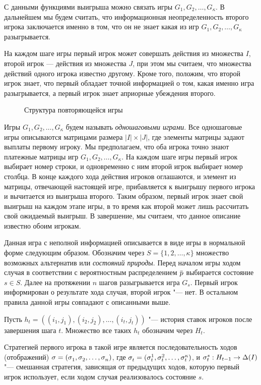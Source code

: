 {С данными функциями выигрыша можно связать игры $G_1, G_2, \ldots, G_\kappa$.
В дальнейшем мы будем считать, что информационная неопределенность второго игрока заключается именно в том, что он не знает какая из игр $G_1, G_2, \ldots, G_\kappa$ разыгрывается.

На каждом шаге игры первый игрок может совершать действия из множества $I$, второй игрок --- действия из множества $J$, при этом мы считаем, что множества действий одного игрока известно другому.
Кроме того, положим, что второй игрок знает, что первый обладает точной информацией о том, какая именно игра разыгрывается, а первый игрок знает априорные убеждения второго.

\begin{figure}[t]
  \centering
  
  \caption{Структура повторяющейся игры}
  \label{ch1:fig:game_structure}
\end{figure}

Игры $G_1, G_2, \ldots, G_\kappa$ будем называть \emph{одношаговыми играми}.
Все одношаговые игры описываются матрицами размера $|I| \times |J|$, где элементы матрицы задают выплаты первому игроку.
Мы предполагаем, что оба игрока точно знают платежные матрицы игр $G_1, G_2, \ldots, G_\kappa$.
На каждом шаге игры первый игрок выбирает номер строки, и одновременно с ним второй игрок выбирает номер столбца.
В конце каждого хода действия игроков оглашаются, и элемент из матрицы, отвечающей настоящей игре, прибавляется к выигрышу первого игрока и вычитается из выигрыша второго.
Таким образом, первый игрок знает свой выигрыш на каждом этапе игры, в то время как второй может лишь рассчитать свой ожидаемый выигрыш.
В завершение, мы считаем, что данное описание известно обоим игрокам.

Данная игра с неполной информацией описывается в виде игры в нормальной форме следующим образом.
Обозначим через $S = \{1, 2, \ldots, \kappa\}$ множество возможных альтернатив или \emph{состояний природы}.
Перед началом игры ходом случая в соответствии с вероятностным распределением $\pd$ выбирается состояние $s \in S$.
Далее на протяжении $n$ шагов разыгрывается игра $G_s$.
Первый игрок информирован о результате хода случая, второй игрок "--- нет.
В остальном правила данной игры совпадают с описанными выше.

Пусть $h_t = \left((i_1, j_1), (i_2, j_2), \ldots, (i_t, j_t)\right)$ "--- история ставок игроков после завершения шага $t$.
Множество все таких $h_t$ обозначим через $H_t$. 

Стратегией первого игрока в такой игре является последовательность ходов (отображений) $\sigmar = (\sigmas{1}, \sigmas{2}, \ldots, \sigmas{n})$, где $\sigmas{t} = (\sigmas[1]{t}, \sigmas[2]{t}, \ldots, \sigmas[\kappa]{t})$, и $\sigmas[s]{t}: H_{t-1} \rightarrow \Delta(I)$ "--- смешанная стратегия, зависящая от предыдущих ходов, которую первый игрок использует, если ходом случая реализовалось состояние $s$.

}
